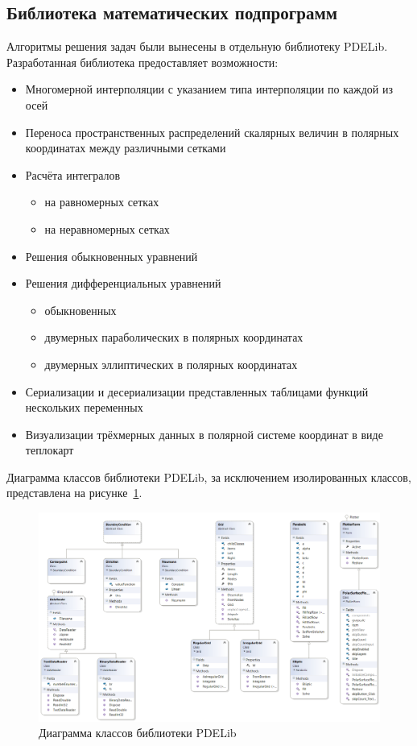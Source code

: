 \subsection{Библиотека математических подпрограмм}
Алгоритмы решения задач были вынесены в отдельную библиотеку PDELib. 
Разработанная библиотека предоставляет возможности:
\begin{itemize}
    \item Многомерной интерполяции с указанием типа интерполяции по каждой из 
    осей
    \item Переноса пространственных распределений скалярных величин в полярных 
    координатах между различными сетками
    \item Расчёта интегралов
    \begin{itemize}
        \item на равномерных сетках
        \item на неравномерных сетках
    \end{itemize}
    \item Решения обыкновенных уравнений
    \item Решения дифференциальных уравнений
    \begin{itemize}
        \item обыкновенных
        \item двумерных параболических в полярных координатах
        \item двумерных эллиптических в полярных координатах
    \end{itemize}
    \item Сериализации и десериализации представленных таблицами функций 
    нескольких переменных
    \item Визуализации трёхмерных данных в полярной системе координат в виде 
    теплокарт
\end{itemize}
Диаграмма классов библиотеки PDELib, за исключением изолированных классов, 
представлена на рисунке~\ref{fig:classDiagPdelib}.

\begin{figure}
    \centering
    \includegraphics[width=\linewidth]{img/classDiag/pdelib}
    \caption{Диаграмма классов библиотеки PDELib}
    \label{fig:classDiagPdelib}
\end{figure}

